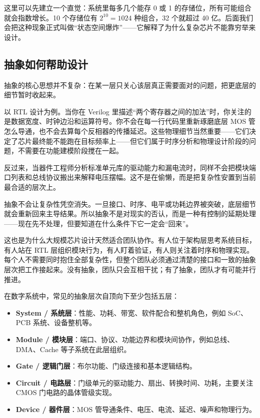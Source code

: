 \documentclass[11pt,a4paper]{article}
\begin{document}
\begin{tipbox}
这里可以先建立一个直觉：系统里每多几个能存 0 或 1 的存储位，所有可能组合就会指数增长。10 个存储位有 $2^{10}=1024$ 种组合，32 个就超过 40 亿。后面我们会把这种现象正式叫做``状态空间爆炸''——它解释了为什么复杂芯片不能靠穷举来设计。
\end{tipbox}

\subsection{抽象如何帮助设计}

抽象的核心思想并不复杂：在某一层只关心该层真正需要面对的问题，把更底层的细节暂时收起来。

以 RTL 设计为例。当你在 Verilog 里描述``两个寄存器之间的加法''时，你关注的是数据宽度、时钟边沿和运算符号。你不会在每一行代码里重新琢磨底层 MOS 管怎么导通，也不会去算每个反相器的传播延迟。这些物理细节当然重要——它们决定了芯片最终能不能跑在目标频率上——但它们属于时序分析和物理设计阶段的问题，不需要在功能建模阶段搅在一起。

反过来，当器件工程师分析标准单元库的驱动能力和漏电流时，同样不会把模块端口列表和总线协议搬出来解释电压摆幅。这不是在偷懒，而是把复杂性安置到当前最合适的层次上。

抽象不会让复杂性凭空消失。一旦接口、时序、电平或功耗边界被突破，底层细节就会重新回来主导结果。所以抽象不是对现实的否认，而是一种有控制的延期处理——现在先不处理，但要知道在什么条件下它一定会``回来''。

这也是为什么大规模芯片设计天然适合团队协作。有人位于架构层思考系统目标，有人站在 RTL 层组织模块行为，有人盯着验证，有人则关注着时序和物理实现。每个人不需要同时抱住全部复杂性，但整个团队必须通过清楚的接口和一致的抽象层次把工作接起来。没有抽象，团队只会互相干扰；有了抽象，团队才有可能并行推进。

在数字系统中，常见的抽象层次自顶向下至少包括五层：

\begin{itemize}
  \item \textbf{System / 系统层}：性能、功耗、带宽、软件配合和整机角色，例如 SoC、PCB 系统、设备整机等。
  \item \textbf{Module / 模块层}：端口、协议、功能边界和模块间协作，例如总线、DMA、Cache 等子系统在此层组织。
  \item \textbf{Gate / 逻辑门层}：布尔功能、门级连接和基本逻辑结构。
  \item \textbf{Circuit / 电路层}：门级单元的驱动能力、扇出、转换时间、功耗，主要关注 CMOS 门电路的晶体管级实现。
  \item \textbf{Device / 器件层}：MOS 管导通条件、电压、电流、延迟、噪声和物理行为。
\end{itemize}
\end{document}
